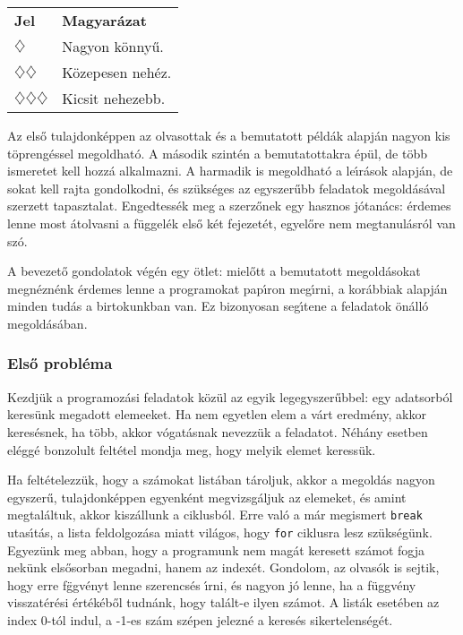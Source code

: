 \documentclass[12pt]{article}
\newcommand{\konnyu}{$\diamondsuit$}
\newcommand{\kozepes}{$\diamondsuit\diamondsuit$}
\newcommand{\nehez}{$\diamondsuit\diamondsuit\diamondsuit$}
\newcounter{feladat}
\newcounter{megold}
\begin{document}
\begin{center}
   \begin{tabular}{ll}
      {\bf Jel} & {\bf Magyar\'azat} \\
      \konnyu & Nagyon k\"onny\H{u}. \\      
	 \kozepes & K\"ozepesen neh\'ez. \\
	 \nehez & Kicsit nehezebb. \\
   \end{tabular}
\end{center}

Az els\H{o} tulajdonk\'eppen az olvasottak \'es a bemutatott p\'eld\'ak alapj\'an nagyon kis t\"opreng\'essel megoldhat\'o. 
A m\'asodik szint\'en a bemutatottakra \'ep\"ul, de t\"obb ismeretet kell hozz\'a alkalmazni. A harmadik is megoldhat\'o 
a le\'{\i}r\'asok alapj\'an, de sokat kell rajta gondolkodni, \'es sz\"uks\'eges az egyszer\H{u}bb feladatok megold\'as\'aval 
szerzett tapasztalat. Engedtess\'ek meg a szerz\H{o}nek egy hasznos j\'otan\'acs: \'erdemes lenne most \'atolvasni a 
f\"uggel\'ek els\H{o} k\'et fejezet\'et, egyel\H{o}re nem megtanul\'asr\'ol van sz\'o.

A bevezet\H{o} gondolatok v\'eg\'en egy \"otlet: miel\H{o}tt a bemutatott megold\'asokat megn\'ezn\'enk \'erdemes lenne a 
programokat pap\'{\i}ron meg\'{\i}rni, a kor\'abbiak alapj\'an minden tud\'as a birtokunkban van. Ez bizonyosan seg\'{\i}tene 
a feladatok \"on\'all\'o megold\'as\'aban.

\subsubsection{Els\H{o} probl\'ema}


Kezdj\"uk a programoz\'asi feladatok k\"oz\"ul az egyik legegyszer\H{u}bbel: egy adatsorb\'ol keres\"unk megadott elemeeket. Ha 
nem egyetlen elem a v\'art eredm\'eny, akkor keres\'esnek, ha t\"obb, akkor v\'ogat\'asnak nevezz\"uk a feladatot. N\'eh\'any 
esetben el\'egg\'e bonzolult felt\'etel mondja meg, hogy melyik elemet keress\"uk.



Ha felt\'etelezz\"uk, hogy a sz\'amokat list\'aban t\'aroljuk, akkor a megold\'as nagyon egyszer\H{u}, tulajdonk\'eppen 
egyenk\'ent megvizsg\'aljuk az elemeket, \'es amint megta\-l\'al\-tuk, akkor kisz\'allunk a ciklusb\'ol. Erre val\'o a 
m\'ar megismert {\tt break} utas\'{\i}t\'as, a lista feldolgoz\'asa miatt vil\'agos, hogy {\tt for} ciklusra lesz 
sz\"uks\'eg\"unk. Egyez\"unk meg abban, hogy a programunk nem mag\'at keresett sz\'amot fogja nek\"unk els\H{o}sorban 
megadni, hanem az index\'et. Gondolom, az olvas\'ok is sejtik, hogy erre f\"ggv\'enyt lenne szerencs\'es \'{\i}rni, \'es 
nagyon j\'o lenne, ha a f\"uggv\'eny visszat\'er\'esi \'ert\'ek\'eb\H{o}l tudn\'ank, hogy tal\'alt-e ilyen sz\'amot. A list\'ak 
eset\'eben az index 0-t\'ol indul, a -1-es sz\'am sz\'epen jelezn\'e a keres\'es sikertelens\'eg\'et.
\end{document}
